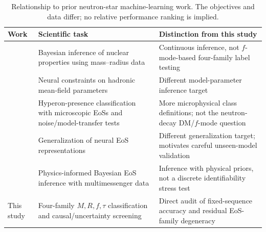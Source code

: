 \documentclass[11pt,a4paper]{article}
\begin{document}
\begin{table}[t]\centering\scriptsize
\caption{Relationship to prior neutron-star machine-learning work. The objectives and data differ; no relative performance ranking is implied.}\label{tab:priorwork}
\begin{tabular}{>{\raggedright\arraybackslash}p{}>{\raggedright\arraybackslash}p{}>{\raggedright\arraybackslash}p{}}\toprule
Work & Scientific task & Distinction from this study\\\midrule
\citet{Carvalho24MR} & Bayesian inference of nuclear properties using mass--radius data & Continuous inference, not $f$-mode-based four-family label testing\\
\citet{Guo24} & Neural constraints on hadronic mean-field parameters & Different model-parameter inference target\\
\citet{Carvalho24Hyp} & Hyperon-presence classification with microscopic EoSs and noise/model-transfer tests & More microphysical class definitions; not the neutron-decay DM/$f$-mode question\\
\citet{Goncalves25} & Generalization of neural EoS representations & Different generalization target; motivates careful unseen-model validation\\
\citet{Baker26} & Physics-informed Bayesian EoS inference with multimessenger data & Inference with physical priors, not a discrete identifiability stress test\\
This study & Four-family $M,R,f,\tau$ classification and causal/uncertainty screening & Direct audit of fixed-sequence accuracy and residual EoS-family degeneracy\\\bottomrule
\end{tabular}\end{table}
\end{document}
